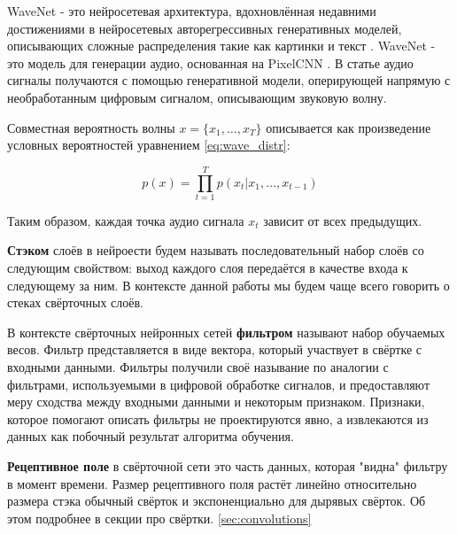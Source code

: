 \documentclass[../diploma.tex]{subfiles}
\begin{document}
WaveNet - это нейросетевая архитектура, вдохновлённая недавними достижениями в нейросетевых авторегрессивных генеративных моделей, описывающих сложные распределения такие как картинки \cite{article:oord2016pixel} и текст \cite{article:jozefowicz2016exploring}. WaveNet - это модель для генерации аудио, основанная на PixelCNN \cite{article:oord2016conditional}.
В статье аудио сигналы получаются с помощью генеративной модели, оперирующей напрямую с необработанным цифровым сигналом, описывающим звуковую волну.

Совместная вероятность волны $x = \{ x_1, \dots, x_T \}$ описывается как произведение условных вероятностей уравнением \ref{eq:wave_distr}:

\begin{equation} \label{eq:wave_distr}
p(x) = \prod^{T}_{t=1}{} p(x_t|x_1, \dots, x_{t-1})
\end{equation}

Таким образом, каждая точка аудио сигнала $x_t$ зависит от всех предыдущих.

\begin{definition}
\textbf{Стэком} слоёв в нейроести будем называть последовательный набор слоёв со следующим свойством: выход каждого слоя передаётся в качестве входа к следующему за ним. В контексте данной работы мы будем чаще всего говорить о стеках свёрточных слоёв.
\end{definition}

\begin{definition}

В контексте свёрточных нейронных сетей \textbf{фильтром} называют набор обучаемых весов.
Фильтр представляется в виде вектора, который участвует в свёртке с входными данными.
Фильтры получили своё называние по аналогии с фильтрами, используемыми в цифровой обработке сигналов, и предоставляют меру сходства между входными данными и некоторым признаком.
Признаки, которое помогают описать фильтры не проектируются явно, а извлекаются из данных как побочный результат алгоритма обучения.
\end{definition}


\begin{definition}
\textbf{Рецептивное поле} в свёрточной сети это часть данных, которая "видна" фильтру в момент времени. Размер рецептивного поля растёт линейно относительно размера стэка обычный свёрток и экспоненциально для дырявых свёрток. Об этом подробнее в секции про свёртки. \ref{sec:convolutions}
\end{definition}
\end{document}
